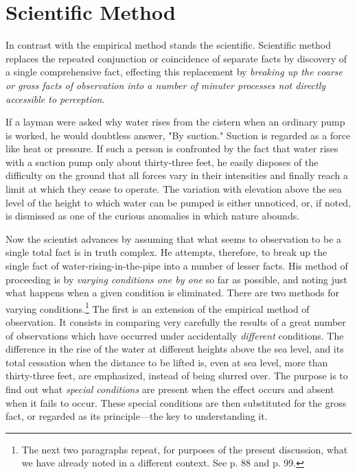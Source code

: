 \documentclass[letterpaper]{book}
\begin{document}
\section{Scientific Method}


In contrast with the empirical method stands the scientific. Scientific
method replaces the repeated conjunction or coincidence of separate
facts by discovery of a single comprehensive fact, effecting this
replacement by \emph{breaking up the coarse or gross facts of
observation into a number of minuter processes not directly accessible
to perception}.


If a layman were asked why water rises from the cistern when an ordinary
pump is worked, he would doubtless answer, "By suction." Suction is
regarded as a force like heat or pressure. If such a person is
confronted by the fact that water rises with a suction pump only about
thirty-three feet, he easily disposes of the difficulty on the ground
that all forces vary in their intensities and finally reach a limit at
which they cease to operate. The variation with elevation above the sea
level of the height to which water can be pumped is either unnoticed,
or, if noted, is dismissed as one of the curious anomalies in which
nature abounds.



Now the scientist advances by assuming that what seems to observation to
be a single total fact is in truth complex. He attempts, therefore, to
break up the single fact of water-rising-in-the-pipe into a number of
lesser facts. His method of proceeding is by \emph{varying conditions
one by one} so far as possible, and noting just what happens when a
given condition is eliminated. There are two methods for varying
conditions.\footnote{
The next two paragraphs repeat, for purposes of the present discussion,
what we have already noted in a different context. See p. 88 and p. 99.
}
The first is an extension of the empirical method of observation. It
consists in comparing very carefully the results of a great number of
observations which have
occurred
under accidentally \emph{different} conditions. The difference in the
rise of the water at different heights above the sea level, and its
total cessation when the distance to be lifted is, even at sea level,
more than thirty-three feet, are emphasized, instead of being slurred
over. The purpose is to find out what \emph{special conditions} are
present when the effect occurs and absent when it fails to occur. These
special conditions are then substituted for the gross fact, or regarded
as its principle---the key to understanding it.
\end{document}
